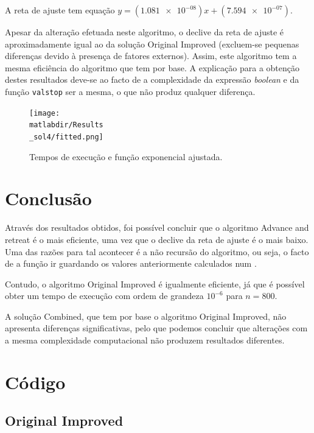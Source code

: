 \documentclass[portuguese,11pt,a4paper,titlepage]{article}
\newcommand{\foreign}[1]{\textit{#1}}
\newcommand{\srcdir}{..}
\newcommand{\matlabdir}{"../MATLAB-fittings"}
\begin{document}
A reta de ajuste tem equação \begin{math}y=(\num{1.081e-08})x+(\num{7.594e-07})\end{math}.

Apesar da alteração efetuada neste algoritmo, o declive da reta de ajuste é aproximadamente igual ao da
solução Original Improved (excluem-se pequenas diferenças devido à presença de fatores externos).
Assim, este algoritmo tem a mesma eficiência do algoritmo que tem por base.
A explicação para a obtenção destes resultados deve-se ao facto de a complexidade da expressão \foreign{boolean}
e da função \verb#valstop# ser a mesma, o que não produz qualquer diferença.

\begin{figure}[h]
	\centering
	\texttt{[image: \\matlabdir/Results\\\_sol4/fitted.png]}
	\caption{Tempos de execução e função exponencial ajustada.}
	\label{fig:sol4}
\end{figure}
\pagebreak

\section{Conclusão}
Através dos resultados obtidos, foi possível concluir que o algoritmo Advance and retreat é o mais eficiente,
uma vez que o declive da reta de ajuste é o mais baixo. Uma das razões para tal acontecer é a não recursão do algoritmo,
ou seja, o facto de a função ir guardando os valores anteriormente calculados num .

Contudo, o algoritmo Original Improved é igualmente eficiente, já que é possível obter um tempo de execução
com ordem de grandeza \begin{math}10^{-6}\end{math} para \begin{math}n = 800\end{math}.

A solução Combined, que tem por base o algoritmo Original Improved, não apresenta diferenças significativas,
pelo que podemos concluir que alterações com a mesma complexidade computacional não produzem resultados diferentes.

\pagebreak
\section{Código}
\subsection{Original Improved}

\pagebreak
\end{document}
